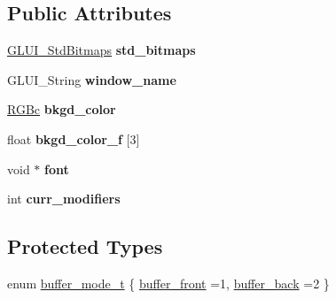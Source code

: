 \subsection*{Public Attributes}
\begin{DoxyCompactItemize}
\item 
\hypertarget{class_g_l_u_i___main_adae87a2e684c2da03d2f8946913eb63d}{\hyperlink{class_g_l_u_i___std_bitmaps}{G\+L\+U\+I\+\_\+\+Std\+Bitmaps} {\bfseries std\+\_\+bitmaps}}\label{class_g_l_u_i___main_adae87a2e684c2da03d2f8946913eb63d}

\item 
\hypertarget{class_g_l_u_i___main_a699c852cb777273543f38506e71c9e22}{G\+L\+U\+I\+\_\+\+String {\bfseries window\+\_\+name}}\label{class_g_l_u_i___main_a699c852cb777273543f38506e71c9e22}

\item 
\hypertarget{class_g_l_u_i___main_a8d939a35dd9fd89091e4345d12f23936}{\hyperlink{class_r_g_bc}{R\+G\+Bc} {\bfseries bkgd\+\_\+color}}\label{class_g_l_u_i___main_a8d939a35dd9fd89091e4345d12f23936}

\item 
\hypertarget{class_g_l_u_i___main_a703f236c77d05226bf6ffd01c5c80d0d}{float {\bfseries bkgd\+\_\+color\+\_\+f} \mbox{[}3\mbox{]}}\label{class_g_l_u_i___main_a703f236c77d05226bf6ffd01c5c80d0d}

\item 
\hypertarget{class_g_l_u_i___main_a349e75284a3c1d4e5e8d1f2903d65f8b}{void $\ast$ {\bfseries font}}\label{class_g_l_u_i___main_a349e75284a3c1d4e5e8d1f2903d65f8b}

\item 
\hypertarget{class_g_l_u_i___main_a96ca3271c5e6a33bd340bd90aa010b14}{int {\bfseries curr\+\_\+modifiers}}\label{class_g_l_u_i___main_a96ca3271c5e6a33bd340bd90aa010b14}

\end{DoxyCompactItemize}
\subsection*{Protected Types}
\begin{DoxyCompactItemize}
\item 
enum \hyperlink{class_g_l_u_i___main_a0024f5e2750f6fe9e428ff885cf6d62e}{buffer\+\_\+mode\+\_\+t} \{ \hyperlink{class_g_l_u_i___main_a0024f5e2750f6fe9e428ff885cf6d62ea96e503bd03e3d418f350f3a854d0292d}{buffer\+\_\+front} =1, 
\hyperlink{class_g_l_u_i___main_a0024f5e2750f6fe9e428ff885cf6d62ea839b43cd2decf85c6bdcf738d92e122c}{buffer\+\_\+back} =2
 \}
\end{DoxyCompactItemize}
